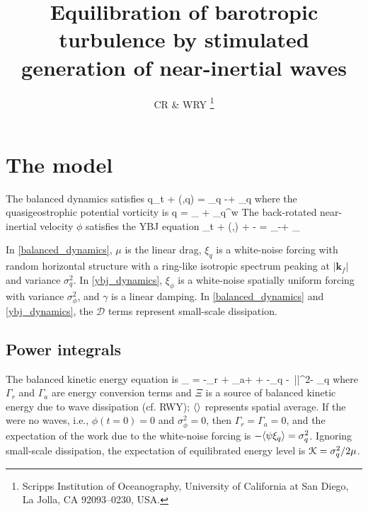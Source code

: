 \documentclass[12pt]{article}
\newcommand{\D}{\mathcal{D}}
\newcommand{\disp}{\eta}
\newcommand{\ze}{\zeta}
\begin{document}
\title{Equilibration of barotropic turbulence by stimulated generation
of near-inertial waves}

\author{
CR  \& WRY \thanks {Scripps Institution of Oceanography,
University of California at San Diego, La Jolla, CA
92093--0230, USA.
}
}


\maketitle

\section{The model}
The balanced dynamics satisfies
\beq
q_t + \sJ(\psi,q)  = \xi_q -\mu \zeta + \D_q \com
\label{balanced_dynamics}
\eeq
where the quasigeostrophic potential vorticity is
\beq
\label{qgpv}
q = \underbrace{\lap \psi}_{ \zeta} +
                _{ q^w}\per
\eeq
The back-rotated near-inertial velocity $\phi$ satisfies the
YBJ equation
\beq
\phi_t + \sJ(\psi,\phi) +  \phi {}\ze -  \disp \lap \phi
 = \xi_\phi -\gamma \phi + \D_\phi\per
 \label{ybj_dynamics}
\eeq

In \eqref{balanced_dynamics}, $\mu$ is the linear drag, $\xi_q$ is a white-noise forcing
with random horizontal structure with a ring-like isotropic spectrum peaking at $|\mathbf{k}_f|$
and variance $\sigma^2_q$.
In \eqref{ybj_dynamics}, $\xi_\phi$ is a white-noise spatially uniform forcing with
variance $\sigma^2_\phi$, and $\gamma$
is a linear damping. In \eqref{balanced_dynamics} and \eqref{ybj_dynamics}, the $\D$ terms represent
small-scale dissipation.

\subsection{Power integrals}

The balanced kinetic energy equation is
\beq
{} \underbrace{\half \la |\nabla \psi|^2 \ra}_{ \K} = -\la\Gamma_r + \Gamma_a\ra + \Xi +
 -\la \psi \xi_q \ra -\ \mu \la|\nabla\psi|^2\ra - \la\psi\D_q\ra\com
\label{Ke}
\eeq
where $\Gamma_r$ and $\Gamma_a$ are energy conversion terms and $\Xi$ is a source of balanced kinetic energy
due to wave dissipation (cf. RWY); $\langle \rangle$ represents spatial average.
If the were no waves, i.e., $\phi(t=0)=0$ and $\sigma_\phi^2=0$,  then $\Gamma_r=\Gamma_a = 0$, and the expectation of the work due to the white-noise forcing
is $-\langle\psi\xi_q\rangle = \sigma_q^2$. Ignoring small-scale dissipation, the expectation of equilibrated energy level
is $\mathcal{K} = \sigma_q^2/2\mu$.
\end{document}
